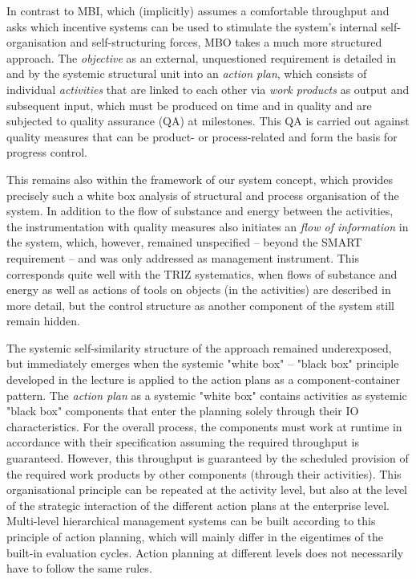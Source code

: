\documentclass[11pt,a4paper]{article}
\begin{document}
In contrast to MBI, which (implicitly) assumes a comfortable throughput and
asks which incentive systems can be used to stimulate the system's internal
self-organisation and self-structuring forces, MBO takes a much more
structured approach. The \emph{objective} as an external, unquestioned
requirement is detailed in and by the systemic structural unit into an
\emph{action plan}, which consists of individual \emph{activities} that are
linked to each other via \emph{work products} as output and subsequent input,
which must be produced on time and in quality and are subjected to quality
assurance (QA) at milestones. This QA is carried out against quality measures
that can be product- or process-related and form the basis for progress
control.

This remains also within the framework of our system concept, which provides
precisely such a white box analysis of structural and process organisation of
the system. In addition to the flow of substance and energy between the
activities, the instrumentation with quality measures also initiates an
\emph{flow of information} in the system, which, however, remained unspecified
-- beyond the SMART requirement -- and was only addressed as management
instrument. This corresponds quite well with the TRIZ systematics, when flows
of substance and energy as well as actions of tools on objects (in the
activities) are described in more detail, but the control structure as another
component of the system still remain hidden.

The systemic self-similarity structure of the approach remained underexposed,
but immediately emerges when the systemic "white box" -- "black box" principle
developed in the lecture is applied to the action plans as a
component-container pattern. The \emph{action plan} as a systemic "white box"
contains activities as systemic "black box" components that enter the planning
solely through their IO characteristics. For the overall process, the
components must work at runtime in accordance with their specification
assuming the required throughput is guaranteed. However, this throughput is
guaranteed by the scheduled provision of the required work products by other
components (through their activities). This organisational principle can be
repeated at the activity level, but also at the level of the strategic
interaction of the different action plans at the enterprise level. Multi-level
hierarchical management systems can be built according to this principle of
action planning, which will mainly differ in the eigentimes of the built-in
evaluation cycles. Action planning at different levels does not necessarily
have to follow the same rules.
\end{document}

